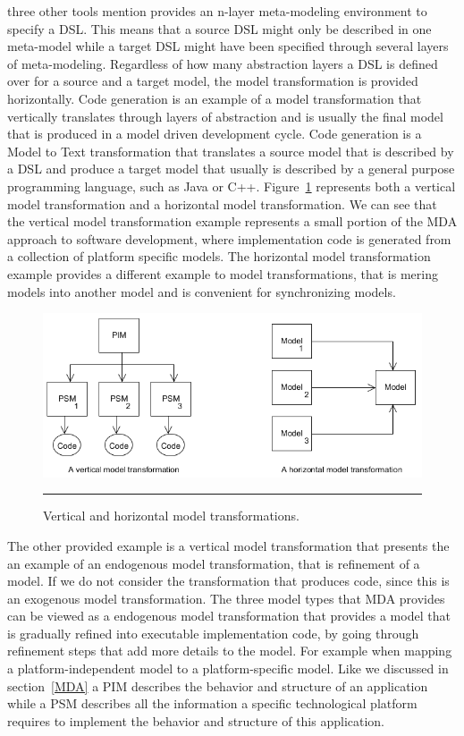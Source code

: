three other tools mention provides an n-layer meta-modeling environment to
specify a DSL. This means that a source DSL might only be described in one
meta-model while a target DSL might have been specified through several layers
of meta-modeling. Regardless of how many abstraction layers a DSL is defined
over for a source and a target model, the model transformation is provided
horizontally. Code generation is an example of a model transformation that
vertically translates through layers of abstraction and is usually the final
model that is produced in a model driven development cycle. Code generation is a
Model to Text transformation that translates a source model that is described by
a DSL and produce a target model that usually is described by a general purpose
programming language, such as Java or C++. Figure~\ref{fig:vertical_horizontal}
represents both a vertical model transformation and a horizontal model
transformation. We can see that the vertical model transformation example
represents a small portion of the MDA approach to software development, where
implementation code is generated from a collection of platform specific models.
The horizontal model transformation example provides a different example to
model transformations, that is mering models into another model and is
convenient for synchronizing models.

\begin{figure}[H]
  \centering
    \includegraphics[scale=0.8]{./Figures/vertical_horizontal.png}
    \rule{35em}{0.5pt}
  \caption[Vertical and Horizontal model transformations]
  {Vertical and horizontal model transformations.}
  \label{fig:vertical_horizontal}
\end{figure}

The other provided example is a vertical model transformation that presents the
an example of an endogenous model transformation, that is refinement of a model.
If we do not consider the transformation that produces code, since this is an
exogenous model transformation. The three model types that MDA provides
can be viewed as a endogenous model transformation that provides a model that
is gradually refined into executable implementation code, by going through
refinement steps that add more details to the model. For example when mapping a
platform-independent model to a platform-specific model. Like we discussed in
section~\ref{MDA} a PIM describes the behavior and structure of an application
while a PSM describes all the information a specific technological platform
requires to implement the behavior and structure of this application. 

